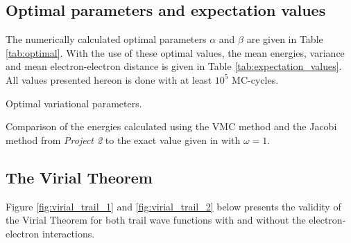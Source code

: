 \documentclass[12pt,english,a4paper]{article}
\begin{document}
\subsection{Optimal parameters and expectation values} \label{section:results:optimal}

The numerically calculated optimal parameters $\alpha$ and $\beta$ are given in Table \ref{tab:optimal}. With the use of these optimal values, the mean energies, variance and mean electron-electron distance is given in Table \ref{tab:expectation_values}. All values presented hereon is done with at least $10^5$ MC-cycles.

\begin{table}[htb]
    \centering
        \caption{Optimal variational parameters.}
        \label{tab:optimal}
\end{table}

\begin{table}[htb]
    \centering
        \caption{Comparison of the energies calculated using the VMC method and the Jacobi method from \textit{Project 2} to the exact value given in \cite{proj5} with $\omega=1$.}
        \label{tab:comparing}
\end{table}

\newpage

\subsection{The Virial Theorem} \label{section:results:virial}

Figure \ref{fig:virial_trail_1} and \ref{fig:virial_trail_2} below presents the validity of the Virial Theorem for both trail wave functions with and without the electron-electron interactions.
\end{document}
